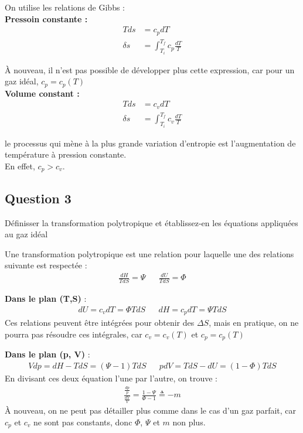 \begin{tcolorbox}
    On utilise les relations de Gibbs : \\

    \textbf{Pressoin constante : }
    \begin{align*}
        Tds &= c_p dT\\
        \delta s &= \int_{T_i}^{T_f} c_p \frac{dT}{T}
    \end{align*}

    À nouveau, il n'est pas possible de développer plus cette expression, car pour un gaz idéal, $c_p = c_p(T)$\\

    \textbf{Volume constant : }
    \begin{align*}
        Tds &= c_v dT\\
        \delta s &= \int_{T_i}^{T_f} c_v \frac{dT}{T}
    \end{align*}

    le processus qui mène à la plus grande variation d'entropie est l'augmentation de température à pression constante.\\
    En effet, $c_p > c_v$.
\end{tcolorbox}

\subsection*{Question 3}

Définisser la transformation polytropique et établissez-en les équations appliquées au gaz idéal

\begin{tcolorbox}
    Une transformation polytropique est une relation pour laquelle une des relations suivante est respectée : 
    \begin{align*}
        \frac{dH}{TdS} = \Psi  & & \frac{dU}{TdS} = \Phi 
    \end{align*}

    \textbf{Dans le plan (T,S)} : 
    \begin{align*}
        dU = c_v dT = \Phi T dS & & dH = c_p dT = \Psi T dS
    \end{align*}
    Ces relations peuvent être intégrées pour obtenir des $\Delta S$, mais en pratique, on ne pourra pas résoudre ces intégrales,
    car $c_v = c_v(T)$ et $c_p = c_p(T)$

    \textbf{Dans le plan (p, V)} : 
    \begin{align*}
        Vdp = dH - TdS = (\Psi - 1)TdS & & pdV = TdS - dU = (1 - \Phi)TdS 
    \end{align*}
    En divisant ces deux équation l'une par l'autre, on trouve : 
    \begin{align*}
        \frac{\frac{dp}{p}}{\frac{dV}{V}} = \frac{1-\Psi}{\Phi - 1} \triangleq -m
    \end{align*}
    À nouveau, on ne peut pas détailler plus comme dans le cas d'un gaz parfait, car $c_p$ et $c_v$ ne sont pas constants,
    donc $\Phi$, $\Psi$ et $m$ non plus.
\end{tcolorbox}


